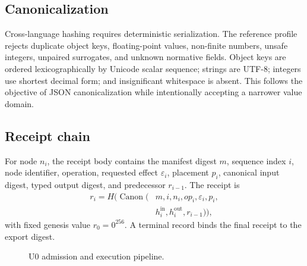 \subsection{Canonicalization}
Cross-language hashing requires deterministic serialization. The reference profile rejects duplicate object keys, floating-point values, non-finite numbers, unsafe integers, unpaired surrogates, and unknown normative fields. Object keys are ordered lexicographically by Unicode scalar sequence; strings are UTF-8; integers use shortest decimal form; and insignificant whitespace is absent. This follows the objective of JSON canonicalization \cite{RFC8785} while intentionally accepting a narrower value domain.

\subsection{Receipt chain}
For node $n_i$, the receipt body contains the manifest digest $m$, sequence index $i$, node identifier, operation, requested effect $\varepsilon_i$, placement $p_i$, canonical input digest, typed output digest, and predecessor $r_{i-1}$. The receipt is
\begin{equation}
\begin{split}
r_i=H\bigl(\operatorname{Canon}(&m,i,n_i,op_i,\varepsilon_i,p_i,\\
&h_i^{\mathrm{in}},h_i^{\mathrm{out}},r_{i-1})\bigr),
\end{split}
\label{eq:receipt}
\end{equation}
with fixed genesis value $r_0=0^{256}$. A terminal record binds the final receipt to the export digest.

\begin{figure}[!t]
\centering
{}
\caption{U0 admission and execution pipeline.}
\label{fig:pipeline}
\end{figure}

